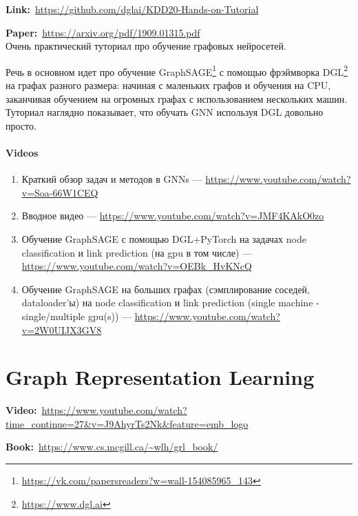 \textbf{Link:}~\url{https://github.com/dglai/KDD20-Hands-on-Tutorial}

\textbf{Paper:}~\url{https://arxiv.org/pdf/1909.01315.pdf} \\

Очень практический туториал про обучение графовых нейросетей. 

Речь в основном идет про обучение GraphSAGE\footnote{\url{https://vk.com/papersreaders?w=wall-154085965_143}} с помощью фрэймворка DGL\footnote{\url{https://www.dgl.ai}} на графах разного размера: начиная с маленьких графов и обучения на CPU, заканчивая обучением на огромных графах с использованием нескольких машин. \\

Туториал наглядно показывает, что обучать GNN используя DGL довольно просто.

\paragraph{Videos}

\begin{enumerate}
    \item Краткий обзор задач и методов в GNNs --- \url{https://www.youtube.com/watch?v=Soa-66W1CEQ}
    \item Вводное видео --- \url{https://www.youtube.com/watch?v=JMF4KAkO0zo}
    \item Обучение GraphSAGE с помощью DGL+PyTorch на задачах node classification и link prediction (на gpu в том числе) --- \url{https://www.youtube.com/watch?v=OEBk_HvKNcQ}
    \item Обучение GraphSAGE на больших графах (сэмплирование соседей, dataloader'ы) на node classification и link prediction (single machine - single/multiple gpu(s)) --- \url{https://www.youtube.com/watch?v=2W0UIJX3GV8}
\end{enumerate}


\section*{Graph Representation Learning}

\textbf{Video:}~\url{https://www.youtube.com/watch?time_continue=27&v=J9AhyrTs2Nk&feature=emb_logo}

\textbf{Book:}~\url{https://www.cs.mcgill.ca/~wlh/grl_book/} \\


